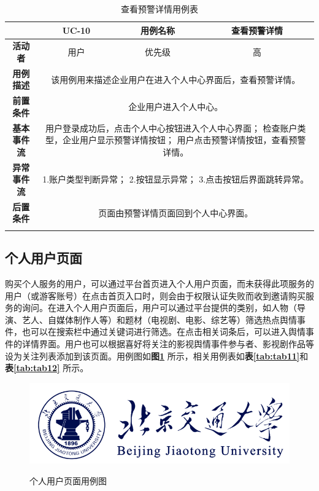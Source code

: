 \begin{longtable}[c]{c|ccc}
	\caption{查看预警详情用例表}
	\label{tab:tab10}\\
	\shline
	\multicolumn{1}{c|}{\textbf{用例编号}} & \multicolumn{1}{c|}{UC-10} & \multicolumn{1}{c|}{用例名称} &  查看预警详情\\ \hline
	\endhead
	\multicolumn{1}{c|}{\textbf{活动者}} & \multicolumn{1}{c|}{用户} & \multicolumn{1}{c|}{优先级} &高  \\ \hline
	\textbf{用例描述} & \multicolumn{3}{p{12cm}}{该用例用来描述企业用户在进入个人中心界面后，查看预警详情。} \\ \hline
	\textbf{前置条件}& \multicolumn{3}{p{12cm}}{企业用户进入个人中心。} \\ \hline
	\textbf{基本事件流}& \multicolumn{3}{p{12cm}}{用户登录成功后，点击个人中心按钮进入个人中心界面；\newline
	    检查账户类型，企业用户显示预警详情按钮；\newline
	    用户点击预警详情按钮，查看预警详情。} \\ \hline
	\textbf{异常事件流}& \multicolumn{3}{p{12cm}}{1.账户类型判断异常；\newline
	    2.按钮显示异常；\newline
	    3.点击按钮后界面跳转异常。
	} \\ \hline
	\textbf{后置条件}& \multicolumn{3}{p{12cm}}{页面由预警详情页面回到个人中心界面。} \\ \shline
\end{longtable}

\subsection{个人用户页面}
购买个人服务的用户，可以通过平台首页进入个人用户页面，而未获得此项服务的用户（或游客账号）在点击首页入口时，则会由于权限认证失败而收到邀请购买服务的询问。在进入个人用户页面后，用户可以通过平台提供的类别，如人物（导演、艺人、自媒体制作人等）和题材（电视剧、电影、综艺等）筛选热点舆情事件，也可以在搜索栏中通过关键词进行筛选。在点击相关词条后，可以进入舆情事件的详情界面。用户也可以根据喜好将关注的影视舆情事件参与者、影视剧作品等设为关注列表添加到该页面。用例图如\textbf{图\ref{fig:fig3}} 所示，相关用例表如\textbf{表\ref{tab:tab11}}和\textbf{表\ref{tab:tab12}} 所示。

\begin{figure}[!htb]
	\centering\label{fig:fig3}
	\includegraphics[scale=1]{image/logo1.png}
	\caption{个人用户页面用例图}
\end{figure}

